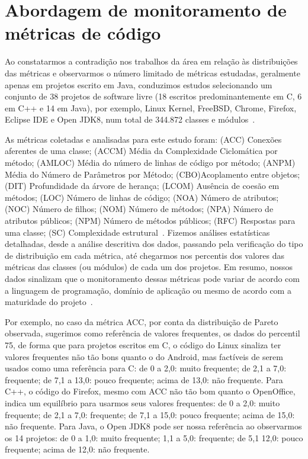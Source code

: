 \documentclass{llncs}
\begin{document}

\section{Abordagem de monitoramento de métricas de código}
\label{sec:abordagem}

Ao constatarmos a contradição nos trabalhos da área em relação às distribuições
das métricas e observarmos o número limitado de métricas estudadas, geralmente
apenas em projetos escrito em Java, conduzimos estudos selecionando um conjunto
de 38 projetos de software livre (18 escritos predominantemente em C, 6 em C++
e 14 em Java), por exemplo, Linux Kernel, FreeBSD, Chrome, Firefox, Eclipse IDE
e Open JDK8, num total de 344.872 classes e
módulos~\cite{meirelles2013monitoramento}.

As métricas coletadas e analisadas para este estudo foram:
(ACC) Conexões aferentes de uma classe;
(ACCM) Média da Complexidade Ciclomática por método;
(AMLOC) Média do número de linhas de código por método;
(ANPM) Média do Número de Parâmetros por Método;
(CBO)Acoplamento entre objetos;
(DIT) Profundidade da árvore de herança;
(LCOM) Ausência de coesão em métodos;
(LOC) Número de linhas de código;
(NOA) Número de atributos;
(NOC) Número de filhos;
(NOM) Número de métodos;
(NPA) Número de atributos públicos;
(NPM) Número de métodos públicos;
(RFC) Respostas para uma classe;
(SC) Complexidade estrutural~\cite{meirelles2013monitoramento}.
%
Fizemos análises estatísticas detalhadas, desde a análise descritiva dos dados,
passando pela verificação do tipo de distribuição em cada métrica, até
chegarmos nos percentis dos valores das métricas das classes (ou módulos) de
cada um dos projetos.
%
Em resumo, nossos dados sinalizam que o monitoramento dessas métricas pode
variar de acordo com a linguagem de programação, domínio de aplicação ou mesmo
de acordo com a maturidade do projeto~\cite{meirelles2013monitoramento}.

Por exemplo, no caso da métrica ACC, por conta da distribuição de Pareto
observada, sugerimos como referência de valores frequentes, os dados do
percentil 75, de forma que para projetos escritos em C, o código do Linux
sinaliza ter valores frequentes não tão bons quanto o do Android, mas factíveis
de serem usados como uma referência para C: de 0 a 2,0: muito frequente; de 2,1
a 7,0: frequente; de 7,1 a 13,0: pouco frequente; acima de 13,0: não frequente.
%
Para C++, o código do Firefox, mesmo com ACC não tão bom quanto o OpenOffice,
indica um equilíbrio para usarmos seus valores frequentes: de 0 a 2,0: muito
frequente; de 2,1 a 7,0: frequente; de 7,1 a 15,0: pouco frequente; acima de
15,0: não frequente.
%
Para Java, o Open JDK8 pode ser nossa referência ao observarmos os 14 projetos:
de 0 a 1,0: muito frequente; 1,1 a 5,0: frequente; de 5,1 12,0: pouco
frequente; acima de 12,0: não frequente.
\end{document}

